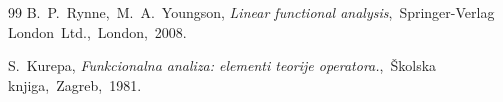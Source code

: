 \documentclass[12pt,a4paper,oneside,fleqn,openany]{book}
\begin{document}


\cleardoublepage 
{}

\begin{thebibliography}{99}
	 B.~P.~Rynne,~M.~A.~Youngson, \emph{Linear functional analysis},~Springer-Verlag London~Ltd.,~London,~2008.
	
	 S.~Kurepa, \emph{Funkcionalna analiza: elementi teorije operatora.},~Školska knjiga,~Zagreb,~1981.


\end{thebibliography}

\end{document}
